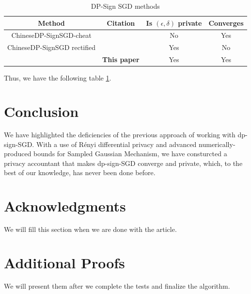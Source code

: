 \documentclass[12pt]{article}
\newcommand{\algname}[1]{{\sf  #1}\xspace}
\begin{document}
\begin{table}\label{compare-chinese}
    \centering
        \small
    \caption{\small DP-Sign SGD methods}

\label{tab:dpsign_methods}    
		\begin{threeparttable}
			\begin{tabular}{|c|c c c|}
			\hline
				Method & Citation & Is $(\epsilon, \delta)$ private & Converges \\
                \hline
                \hline
				\algname{ChineseDP-SignSGD-cheat} & \parencite{Jin2020} & No & Yes\\
                \hline
                \algname{ChineseDP-SignSGD rectified} & \parencite{Jin2020} & Yes & No\\
                \hline
				\rowcolor{bgcolor2}\algname{Rényi DP-SignSGD} & \textbf{This paper} & Yes & Yes\\
			    \hline
			\end{tabular}
		\end{threeparttable}
\vspace{-2mm}
\end{table}

Thus, we have the following table \ref{tab:dpsign_methods}.

\section{Conclusion}
We have highlighted the deficiencies of the previous approach of working with dp-sign-SGD. With a use of Rényi differential privacy and advanced numerically-produced bounds for Sampled Gaussian Mechanism, we have consturcted a privacy accountant that makes dp-sign-SGD converge and private, which, to the best of our knowledge, has never been done before. 

\section{Acknowledgments}
We will fill this section when we are done with the article.

\appendix
\section{Additional Proofs}
We will present them after we complete the tests and finalize the algorithm.

\printbibliography
\end{document}
